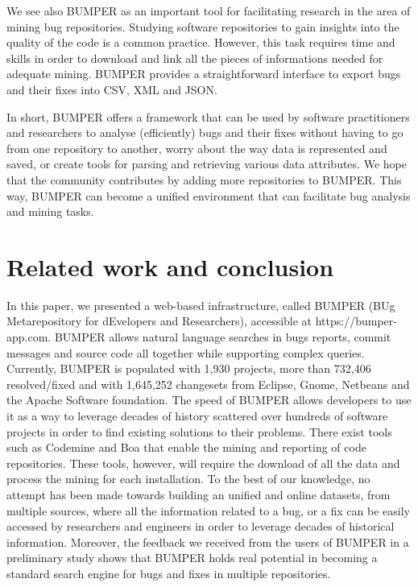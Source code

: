 \documentclass[conference]{IEEEtran}
\begin{document}
We see also BUMPER as an important tool for facilitating research in the area
of mining bug repositories. Studying software repositories to gain insights
into the quality of the code is a common practice.
However, this task requires
time and skills in order to download and link all the pieces of informations
needed for adequate mining. BUMPER provides a straightforward interface to
export bugs and their fixes into CSV, XML and JSON.

In short, BUMPER offers a framework that can be used by software practitioners
and researchers to analyse (efficiently) bugs and their fixes without having
to go from one repository to another,  worry about the way data is represented
and saved, or create tools for parsing and retrieving various data attributes.
We hope that the community contributes by adding more repositories to BUMPER.
This way, BUMPER can become a unified environment that can facilitate bug
analysis and mining tasks.

\section{Related work and conclusion}
\label{sec:conclusion}

In this paper, we presented a web-based infrastructure, called BUMPER
(BUg Metarepository for dEvelopers and Researchers),
accessible at https://bumper-app.com. BUMPER allows natural language searches
in bugs reports, commit messages and source code all together while supporting
complex queries. Currently, BUMPER is populated with  1,930 projects,
more than 732,406 resolved/fixed and with 1,645,252 changesets from Eclipse,
Gnome, Netbeans and the Apache Software foundation.
The speed of BUMPER allows developers to use it as a way to leverage decades
of history scattered over hundreds of software projects in order to find
existing solutions to their problems. There exist tools such as
Codemine\cite{Czerwonka2013} and Boa \cite{Dyer2013} that enable the mining
and reporting of code repositories. These tools, however, will require the
download of all the data and process the mining for each installation.
To the best of our knowledge, no attempt has been made towards building an
unified and online datasets, from multiple sources, where all the information
related to a bug, or a fix can be easily accessed by researchers and engineers
in order to leverage decades of historical information.
Moreover, the feedback we received from the users of BUMPER in a preliminary
study shows that BUMPER holds real potential in becoming a standard search
engine for bugs and fixes in multiple repositories.



\end{document}
